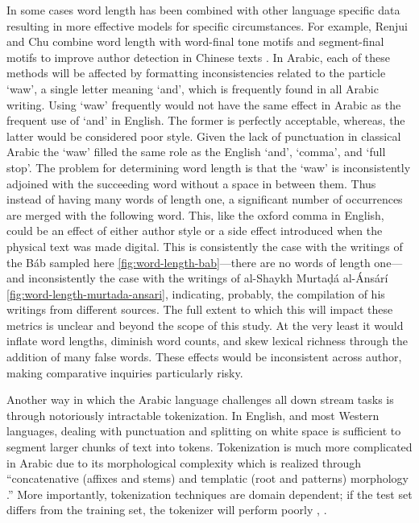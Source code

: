\documentclass[12pt, oneside]{report}
\begin{document}
In some cases word length has been combined with other language specific data resulting in more effective models for specific circumstances.
For example, Renjui and Chu combine word length with word-final tone motifs and segment-final motifs to improve author detection in Chinese texts \cite{renkui_stylometric_nodate}.
In Arabic, each of these methods will be affected by formatting inconsistencies related to the particle `waw', a single letter meaning `and', which is frequently found in all Arabic writing.
Using `waw' frequently would not have the same effect in Arabic as the frequent use of `and' in English.
The former is perfectly acceptable, whereas, the latter would be considered poor style.
Given the lack of punctuation in classical Arabic the `waw' filled the same role as the English `and', `comma', and `full stop'.
The problem for determining word length is that the `waw' is inconsistently adjoined with the succeeding word without a space in between them.
Thus instead of having many words of length one, a significant number of occurrences are merged with the following word.
This, like the oxford comma in English, could be an effect of either author style or a side effect introduced when the physical text was made digital.
This is consistently the case with the writings of the B\'{a}b sampled here \autoref{fig:word-length-bab}---there are no words of length one---and inconsistently the case with the writings of al-Shaykh Murtaḍ\'{a} al-\'{A}ns\'{a}r\'{i} \autoref{fig:word-length-murtada-ansari}, indicating, probably, the compilation of his writings from different sources.
The full extent to which this will impact these metrics is unclear and beyond the scope of this study.
At the very least it would inflate word lengths, diminish word counts, and skew lexical richness through the addition of many false words.
These effects would be inconsistent across author, making comparative inquiries particularly risky.
\par
Another way in which the Arabic language challenges all down stream tasks is through notoriously intractable tokenization.
In English, and most Western languages, dealing with punctuation and splitting on white space is sufficient to segment larger chunks of text into tokens.
Tokenization is much more complicated in Arabic due to its morphological complexity which is realized through ``concatenative (affixes and stems) and templatic (root and patterns) morphology \cite{habash_arabic_2006}.''
More importantly, tokenization techniques are domain dependent; if the test set differs from the training set, the tokenizer will perform poorly \cite{sajjad_challenging_2017}, \cite{habash_arabic_2006}.
\end{document}
